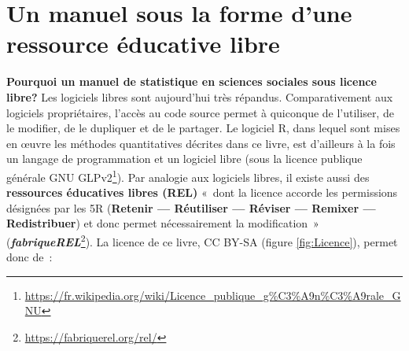 \documentclass[
  11pt,
  french,
]{book}
\renewcommand{\href}[2]{#2\footnote{\url{#1}}}
\begin{document}
\hypertarget{sect001}{%
\section*{Un manuel sous la forme d'une ressource éducative libre}\label{sect001}}

\textbf{Pourquoi un manuel de statistique en sciences sociales sous licence libre?} Les logiciels libres sont aujourd'hui très répandus. Comparativement aux logiciels propriétaires, l'accès au code source permet à quiconque de l'utiliser, de le modifier, de le dupliquer et de le partager. Le logiciel R, dans lequel sont mises en œuvre les méthodes quantitatives décrites dans ce livre, est d'ailleurs à la fois un langage de programmation et un logiciel libre (sous la licence publique générale \href{https://fr.wikipedia.org/wiki/Licence_publique_g\%C3\%A9n\%C3\%A9rale_GNU}{GNU GLPv2}). Par analogie aux logiciels libres, il existe aussi des \textbf{ressources éducatives libres (REL)} «~dont la licence accorde les permissions désignées par les 5R (\textbf{Retenir --- Réutiliser --- Réviser --- Remixer --- Redistribuer}) et donc permet nécessairement la modification~» (\href{https://fabriquerel.org/rel/}{\textbf{\emph{fabriqueREL}}}). La licence de ce livre, CC BY-SA (figure \ref{fig:Licence}), permet donc de~:
\end{document}

